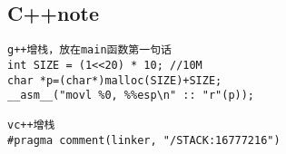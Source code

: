 \subsection{C++note}
\begin{verbatim}
g++增栈，放在main函数第一句话
int SIZE = (1<<20) * 10; //10M 
char *p=(char*)malloc(SIZE)+SIZE;
__asm__("movl %0, %%esp\n" :: "r"(p));

vc++增栈
#pragma comment(linker, "/STACK:16777216")
\end{verbatim}
